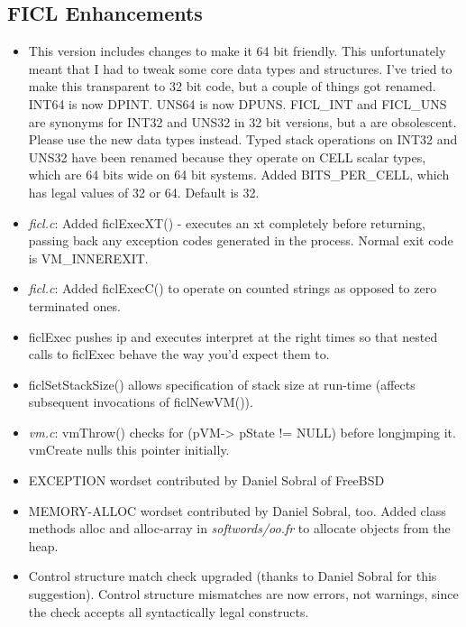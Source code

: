 \subsection*{FICL Enhancements}
\begin{itemize}[noitemsep]
	\item This version includes changes to make it 64 bit friendly.
	This unfortunately meant that I had to tweak some core data
	types and structures. I've tried to make this transparent to 32
	bit code, but a couple of things got renamed. INT64 is now
	DPINT. UNS64 is now DPUNS. FICL\_INT and FICL\_UNS are synonyms
	for INT32 and UNS32 in 32 bit versions, but a are obsolescent.
	Please use the new data types instead. Typed stack operations
	on INT32 and UNS32 have been renamed because they operate on
	CELL scalar types, which are 64 bits wide on 64 bit systems.
	Added BITS\_PER\_CELL, which has legal values of 32 or 64.
	Default is 32.

	\item \textit{ficl.c}: Added ficlExecXT() - executes an xt
	completely before returning, passing back any exception codes
	generated in the process. Normal exit code is VM\_INNEREXIT.

	\item \textit{ficl.c}: Added ficlExecC() to operate on counted
	strings as opposed to zero terminated ones.

	\item ficlExec pushes ip and executes interpret at the right
	times so that nested calls to ficlExec behave the way you'd
	expect them to.

	\item ficlSetStackSize() allows specification of stack size at
	run-time (affects subsequent invocations of ficlNewVM()).

	\item \textit{vm.c}: vmThrow() checks for (pVM-\textgreater
	pState != NULL) before longjmping it. vmCreate nulls this
	pointer initially.

	\item EXCEPTION wordset contributed by Daniel Sobral of FreeBSD

	\item MEMORY-ALLOC wordset contributed by Daniel Sobral, too.
	Added class methods alloc and alloc-array in
	\textit{softwords/oo.fr} to allocate objects from the heap.

	\item Control structure match check upgraded (thanks to Daniel
	Sobral for this suggestion). Control structure mismatches are
	now errors, not warnings, since the check accepts all
	syntactically legal constructs.


\end{itemize}
